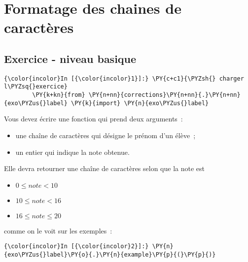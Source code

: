     
    
    
    

    

    \hypertarget{formatage-des-chaines-de-caractuxe8res}{%
\section{Formatage des chaines de
caractères}\label{formatage-des-chaines-de-caractuxe8res}}

    \hypertarget{exercice---niveau-basique}{%
\subsection{Exercice - niveau basique}\label{exercice---niveau-basique}}

    \begin{Verbatim}[commandchars=\\\{\}]
{\color{incolor}In [{\color{incolor}1}]:} \PY{c+c1}{\PYZsh{} charger l\PYZsq{}exercice}
        \PY{k+kn}{from} \PY{n+nn}{corrections}\PY{n+nn}{.}\PY{n+nn}{exo\PYZus{}label} \PY{k}{import} \PY{n}{exo\PYZus{}label}
\end{Verbatim}


    Vous devez écrire une fonction qui prend deux arguments~:

\begin{itemize}
\tightlist
\item
  une chaîne de caractères qui désigne le prénom d'un élève~;
\item
  un entier qui indique la note obtenue.
\end{itemize}

Elle devra retourner une chaîne de caractères selon que la note est

\begin{itemize}
\tightlist
\item
  \(0 \leqslant note \lt 10\)
\item
  \(10 \leqslant note \lt 16\)
\item
  \(16 \leqslant note \leqslant 20\)
\end{itemize}

comme on le voit sur les exemples~:

    \begin{Verbatim}[commandchars=\\\{\}]
{\color{incolor}In [{\color{incolor}2}]:} \PY{n}{exo\PYZus{}label}\PY{o}{.}\PY{n}{example}\PY{p}{(}\PY{p}{)}
\end{Verbatim}


